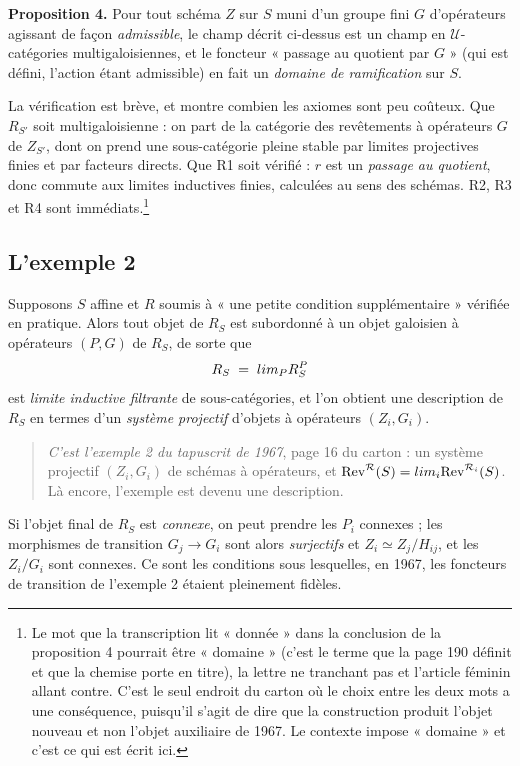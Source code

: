 \documentclass[11pt,a4paper]{article}
\begin{document}
\textbf{Proposition 4.} Pour tout schéma $Z$ sur $S$ muni d'un groupe fini $G$
d'opérateurs agissant de façon \emph{admissible}, le champ décrit ci-dessus est
un champ en $\mathcal{U}$-catégories multigaloisiennes, et le foncteur
« passage au quotient par $G$ » (qui est défini, l'action étant admissible)
en fait un \emph{domaine de ramification} sur $S$.

La vérification est brève, et montre combien les axiomes sont peu coûteux. Que $R_{S'}$ soit multigaloisienne : on part de la catégorie
des revêtements à opérateurs $G$ de $Z_{S'}$, dont on prend une sous-catégorie
pleine stable par limites projectives finies et par facteurs directs. Que R1
soit vérifié : $r$ est un \emph{passage au quotient}, donc commute aux limites
inductives finies, calculées au sens des schémas. R2, R3 et R4 sont
immédiats.\footnote{Le mot que la transcription lit « donnée » dans la
conclusion de la proposition 4 pourrait être « domaine » (c'est le terme que
la page 190 définit et que la chemise porte en titre), la lettre ne tranchant
pas et l'article féminin allant contre. C'est le seul endroit du carton où le
choix entre les deux mots a une conséquence, puisqu'il s'agit de
dire que la construction produit l'objet nouveau et non l'objet auxiliaire de
1967. Le contexte impose « domaine » et c'est ce qui est écrit ici.}

\subsection*{L'exemple 2}

Supposons $S$ affine et $R$ soumis à « une petite condition supplémentaire »
vérifiée en pratique. Alors tout objet de $R_{S}$ est subordonné à un objet
galoisien à opérateurs $(P, G)$ de $R_{S}$, de sorte que
\[
  R_{S} \;=\; \varinjlim_{P} R^{P}_{S}
\]
est \emph{limite inductive filtrante} de sous-catégories, et l'on obtient une
description de $R_{S}$ en termes d'un \emph{système projectif} d'objets à
opérateurs $(Z_{i}, G_{i})$.

\begin{quote}
\emph{C'est l'exemple 2 du tapuscrit de 1967}, page 16 du carton : un système
projectif $(Z_{i}, G_{i})$ de schémas à opérateurs, et
$\mathrm{Rev}^{\mathcal{R}}(S) = \varinjlim_{i}
\mathrm{Rev}^{\mathcal{R}_{i}}(S)$. Là encore, l'exemple est devenu une
description.
\end{quote}

Si l'objet final de $R_{S}$ est \emph{connexe}, on peut prendre les $P_{i}$
connexes ; les morphismes de transition $G_{j} \to G_{i}$ sont alors
\emph{surjectifs} et $Z_{i} \simeq Z_{j}/H_{ij}$, et les $Z_{i}/G_{i}$ sont
connexes. Ce sont les conditions sous lesquelles, en 1967, les
foncteurs de transition de l'exemple 2 étaient pleinement fidèles.
\end{document}
